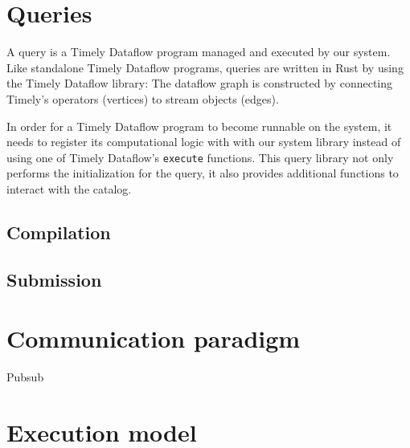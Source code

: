 \section{Queries}

A query is a Timely Dataflow program managed and executed by our system. Like
standalone Timely Dataflow programs, queries are written in Rust by using the
Timely Dataflow library: The dataflow graph is constructed by connecting
Timely's operators (vertices) to stream objects (edges).

In order for a Timely Dataflow program to become runnable on the system, it needs
to register its computational logic with with our system library instead of
using one of Timely Dataflow's \texttt{execute} functions. This query library
not only performs the initialization for the query, it also provides additional
functions to interact with the catalog.

\subsection{Compilation}

\subsection{Submission}

\section{Communication paradigm}

Pubsub

\section{Execution model}
